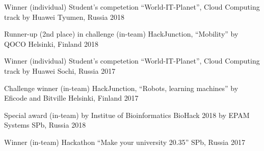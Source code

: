 



\begin{cvhonors}

	\cvhonor
		{Winner (individual)} %
		{Student's competetion \enquote{World-IT-Planet}, Cloud Computing track by Huawei} %
		{Tyumen, Russia} %
		{2018} %
		
	\cvhonor
		{Runner-up (2nd place) in challenge (in-team)} %
		{HackJunction, \enquote{Mobility} by QOCO} %
		{Helsinki, Finland} %
		{2018} %
		

	\cvhonor
		{Winner (individual)} %
		{Student's competetion \enquote{World-IT-Planet}, Cloud Computing track by Huawei} %
		{Sochi, Russia} %
		{2017} %
		
	\cvhonor
		{Challenge winner (in-team)} %
		{HackJunction, \enquote{Robots, learning machines} by Eficode and Bitville} %
		{Helsinki, Finland} %
		{2017} %

\end{cvhonors}




\begin{cvhonors}

	\cvhonor
		{Special award (in-team) by Institue of Bioinformatics} %
		{BioHack 2018 by EPAM Systems} %
		{SPb, Russia} %
		{2018} %

	\cvhonor
		{Winner (in-team)} %
		{Hackathon \enquote{Make your university 20.35}} %
		{SPb, Russia} %
		{2017} %


\end{cvhonors}
